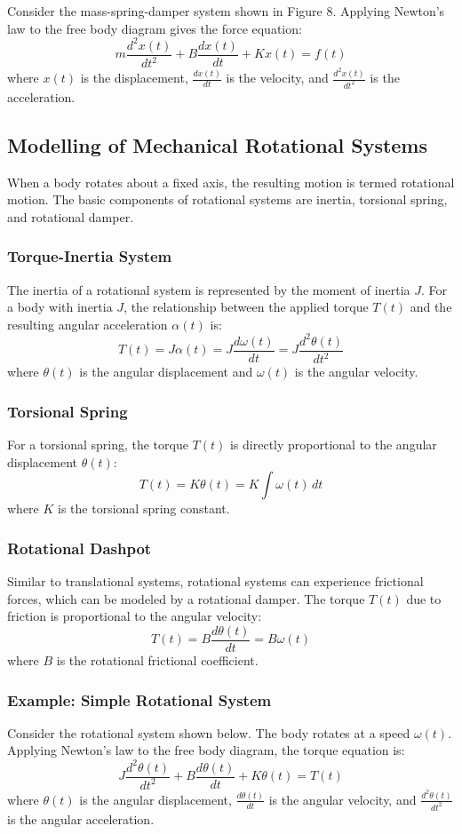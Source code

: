\documentclass[../notes-main.tex]{subfiles}
\begin{document}
Consider the mass-spring-damper system shown in Figure 8. Applying Newton’s law to the free body diagram gives the force equation:
\[
m \frac{d^2x(t)}{dt^2} + B \frac{dx(t)}{dt} + K x(t) = f(t)
\]
where \( x(t) \) is the displacement, \( \frac{dx(t)}{dt} \) is the velocity, and \( \frac{d^2x(t)}{dt^2} \) is the acceleration.

\subsection{Modelling of Mechanical Rotational Systems}

When a body rotates about a fixed axis, the resulting motion is termed rotational motion. The basic components of rotational systems are inertia, torsional spring, and rotational damper.

\subsubsection{Torque-Inertia System}

The inertia of a rotational system is represented by the moment of inertia \( J \). For a body with inertia \( J \), the relationship between the applied torque \( T(t) \) and the resulting angular acceleration \( \alpha(t) \) is:
\[
T(t) = J \alpha(t) = J \frac{d\omega(t)}{dt} = J \frac{d^2\theta(t)}{dt^2}
\]
where \( \theta(t) \) is the angular displacement and \( \omega(t) \) is the angular velocity.

\subsubsection{Torsional Spring}

For a torsional spring, the torque \( T(t) \) is directly proportional to the angular displacement \( \theta(t) \):
\[
T(t) = K \theta(t) = K \int \omega(t) \, dt
\]
where \( K \) is the torsional spring constant.

\subsubsection{Rotational Dashpot}

Similar to translational systems, rotational systems can experience frictional forces, which can be modeled by a rotational damper. The torque \( T(t) \) due to friction is proportional to the angular velocity:
\[
T(t) = B \frac{d\theta(t)}{dt} = B \omega(t)
\]
where \( B \) is the rotational frictional coefficient.

\subsubsection{Example: Simple Rotational System}

Consider the rotational system shown below. The body rotates at a speed \( \omega(t) \). Applying Newton’s law to the free body diagram, the torque equation is:
\[
J \frac{d^2\theta(t)}{dt^2} + B \frac{d\theta(t)}{dt} + K \theta(t) = T(t)
\]
where \( \theta(t) \) is the angular displacement, \( \frac{d\theta(t)}{dt} \) is the angular velocity, and \( \frac{d^2\theta(t)}{dt^2} \) is the angular acceleration.
\end{document}
